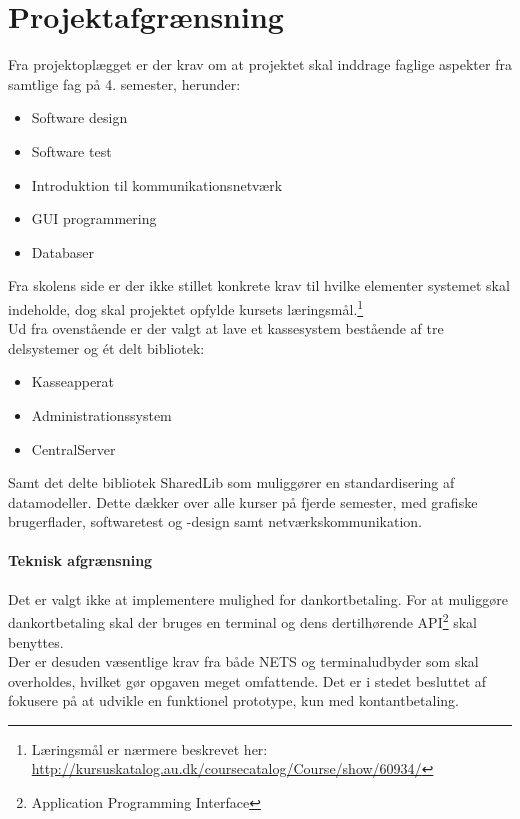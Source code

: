 \chapter{Projektafgrænsning}
Fra projektoplægget er der krav om at projektet skal inddrage faglige aspekter fra samtlige fag på 4. semester, herunder:

	\begin{itemize}
		\item Software design
		\item Software test
		\item Introduktion til kommunikationsnetværk
		\item GUI programmering
		\item Databaser
	\end{itemize}

Fra skolens side er der ikke stillet konkrete krav til hvilke elementer systemet skal indeholde, dog skal projektet opfylde kursets læringsmål.\footnote{Læringsmål er nærmere beskrevet her: \url{http://kursuskatalog.au.dk/coursecatalog/Course/show/60934/}}\\
Ud fra ovenstående er der valgt at lave et kassesystem bestående af tre delsystemer og ét delt bibliotek:
\begin{itemize}
	\item Kasseapperat
	\item Administrationssystem
	\item CentralServer
\end{itemize}

Samt det delte bibliotek SharedLib som muliggører en standardisering af datamodeller. Dette dækker over alle kurser på fjerde semester, med grafiske brugerflader, softwaretest og -design samt netværkskommunikation.

\subsubsection{Teknisk afgrænsning}
Det er valgt ikke at implementere mulighed for dankortbetaling. For at muliggøre dankortbetaling skal der bruges en terminal og dens dertilhørende API\footnote{Application Programming Interface} skal benyttes.\\
 Der er desuden væsentlige krav fra både NETS og terminaludbyder som skal overholdes, hvilket gør opgaven meget omfattende. Det er i stedet besluttet af fokusere på at udvikle en funktionel prototype, kun med kontantbetaling.

